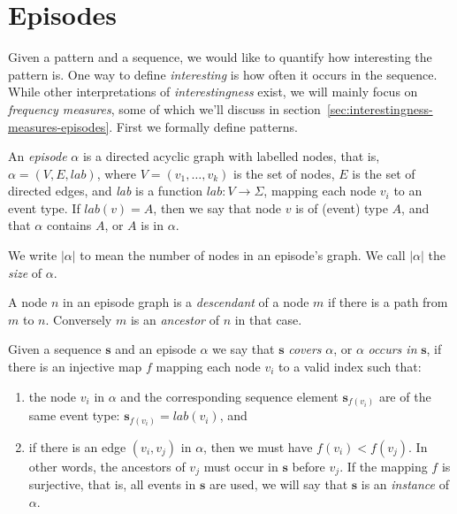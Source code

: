 \section{Episodes}

Given a pattern and a sequence, we would like to quantify how interesting the pattern is. One way to define \emph{interesting} is how often it occurs in the sequence. While other interpretations of \emph{interestingness} exist, we will mainly focus on \emph{frequency measures}, some of which we'll discuss in section~\ref{sec:interestingness-measures-episodes}. First we formally define patterns.


\begin{definition}
An \emph{episode} $ \alpha $ is a directed acyclic graph with labelled nodes, that is, $ \alpha = (V, E, lab) $, where $ V = (v_1, \ldots, v_k) $ is the set of nodes, $ E $ is the set of directed edges, and \emph{lab} is a function $ lab \colon V \rightarrow \Sigma $, mapping each node $ v_i $ to an event type. If $ lab(v) = A $, then we say that node $ v $ is of (event) type $ A $, and that $ \alpha $ contains $ A $, or $ A $ is in $ \alpha $.
\end{definition}

We write $ | \alpha | $ to mean the number of nodes in an episode's graph. We call $ | \alpha | $ the \emph{size} of $ \alpha $.

\begin{definition}
A node $ n $ in an episode graph is a \emph{descendant} of a node $ m $ if there is a path from $ m $ to $ n $. Conversely $ m $ is an \emph{ancestor} of $ n $ in that case.
\end{definition}

\begin{definition}
Given a sequence $ \boldsymbol{s} $ and an episode $ \alpha $ we say that $ \boldsymbol{s} $ \emph{covers} $ \alpha $, or $ \alpha $ \emph{occurs in} $ \boldsymbol{s} $, if there is an injective map $ f $ mapping each node $ v_i $ to a valid index such that:
\begin{enumerate}
\item the node $ v_i $ in $ \alpha $ and the corresponding sequence element $ \boldsymbol{s}_{f(v_i)} $ are of the same event type: $ \boldsymbol{s}_{f(v_i)} = lab(v_i) $, and
\item if there is an edge $ (v_i, v_j) $ in $ \alpha $, then we must have $ f(v_i) < f(v_j) $. In other words, the ancestors of $ v_j $ must occur in $ \boldsymbol{s} $ before $ v_j $. If the mapping $ f $ is surjective, that is, all events in $ \boldsymbol{s} $ are used, we will say that $ \boldsymbol{s} $ is an \emph{instance} of $ \alpha $.
\end{enumerate}
\end{definition}

